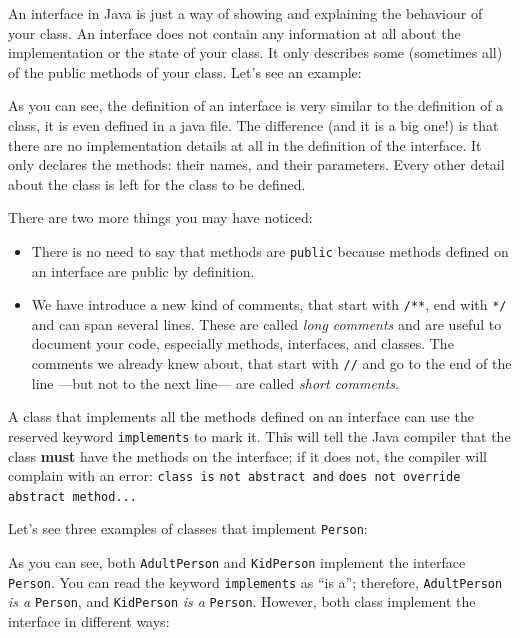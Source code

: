 An interface in Java is just a way of showing and explaining the
behaviour of your class. An interface does not contain any information
at all about the implementation or the state of your class. It only
describes some (sometimes all) of the public methods of your
class. Let's see an example: 


As you can see, the definition of an interface is very similar to the
definition of a class, it is even defined in a java file. 
The difference (and it is a big one!) is that
there are no implementation details at all in the definition of the
interface. It only declares the methods: their names, and their
parameters. Every other detail about the class is left for the class
to be defined. 

There are two more things you may have noticed: 

\begin{itemize}
\item There is no need to say that methods are \verb+public+
  because methods defined on an interface are public by definition.
\item We have introduce a new kind of comments, that start with
  \verb+/**+, end with \verb+*/+ and can span several lines. These
  are called \emph{long comments} and are useful to document your
  code, especially methods, interfaces, and classes. The comments we
  already knew about, that start with \verb+//+ and go to the end of
  the line ---but not to the next line--- are called \emph{short
    comments}. 
\end{itemize}

A class that implements all the methods defined on an interface can
use the reserved keyword \verb+implements+ to mark it. This will tell
the Java compiler that the class \textbf{must} have the methods on the
interface; if it does not, the compiler will complain with an error:
\verb+class is+ \verb+not abstract and+ \verb+does not override+
\verb+abstract method...+ 

Let's see three examples of classes that implement \verb+Person+:



As you can see, both \verb+AdultPerson+ and \verb+KidPerson+ implement
the interface \verb+Person+. You can read the keyword
\verb+implements+ as ``is a''; therefore, \verb+AdultPerson+ 
\emph{is a} \verb+Person+, and \verb+KidPerson+ \emph{is a}
\verb+Person+. However, both class implement the interface in
different ways:  

